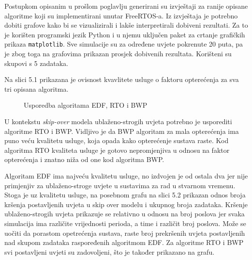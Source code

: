 \documentclass[../zavrsni.tex]{subfiles}
\begin{document}
\sloppy

\justifying

Postupkom opisanim u prošlom poglavlju generirani su izvještaji za ranije opisane algoritme koji su implementirani unutar FreeRTOS-a.
Iz izvještaja je potrebno dobiti grafove kako bi se vizualizirali i lakše interpretirali dobiveni rezultati. 
Za to je korišten programski jezik Python i u njemu uključen paket za crtanje grafičkih prikaza \texttt{matplotlib}. 
Sve simulacije su za određene uvjete pokrenute 20 puta, pa je zbog toga na grafovima prikazan prosjek dobivenih rezultata. 
Korišteni su skupovi s 5 zadataka. 

Na slici 5.1 prikazana je ovisnost kvavlitete usluge o faktoru opterećenja za sva tri opisana algoritma.

\begin{figure}[!htb]
    \caption{\label{fig:my-label} Usporedba algoritama EDF, RTO i BWP}
\end{figure}

U kontekstu \textit{skip-over} modela ublaženo-strogih uvjeta potrebno je usporediti algoritme RTO i BWP. 
Vidljivo je da BWP algoritam za mala 
opterećenja ima puno veću kvalitetu usluge, koja opada kako opterećenje sustava raste. Kod algoritma RTO kvaliteta usluge je gotovo nepromjenjiva
u odnosu na faktor opterećenja i znatno niža od one kod algoritma BWP. 

Algoritam EDF ima najveću kvalitetu usluge, no izdvojen je od ostala dva jer nije primjenjiv za ublaženo-stroge
uvjete u sustavima za rad u stvarnom vremenu. Stoga je uz kvalitetu usluge, na posebnom grafu na slici 5.2 prikazan odnos broja kršenja 
postavljenih uvjeta u skip over modelu i ukupnog broja zadataka. Kršenje ublaženo-strogih uvjeta prikazuje se relativno u odnosu na broj 
poslova jer svaka simulacija ima različite vrijednosti perioda, a time i različit broj poslova.
Može se uočiti da porastom opetrećenja sustava, raste broj prekršenih uvjeta postavljenih nad skupom zadataka raspoređenih algoritmom EDF.
Za algoritme RTO i BWP svi postavljeni uvjeti su zadovoljeni, što je također prikazano na grafu.
\end{document}
